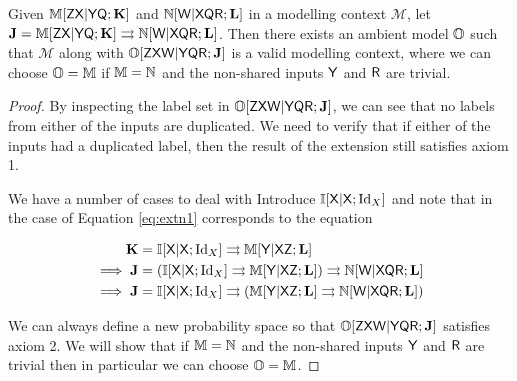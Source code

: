 \begin{theorem}
Given $\mathbb{M}[\mathsf{Z}\mathsf{X}|\mathsf{Y}\mathsf{Q};\mathbf{K}]$ and $\mathbb{N}[\mathsf{W}|\mathsf{X}\mathsf{Q}\mathsf{R};\mathbf{L}]$ in a modelling context $\mathscr{M}$, let $\mathbf{J}=\mathbb{M}[\mathsf{Z}\mathsf{X}|\mathsf{Y}\mathsf{Q};\mathbf{K}]\rightrightarrows \mathbb{N}[\mathsf{W}|\mathsf{X}\mathsf{Q}\mathsf{R};\mathbf{L}]$. Then there exists an ambient model $\mathbb{O}$ such that $\mathscr{M}$ along with $\mathbb{O}[\mathsf{Z}\mathsf{X}\mathsf{W}|\mathsf{Y}\mathsf{Q}\mathsf{R};\mathbf{J}]$ is a valid modelling context, where we can choose $\mathbb{O}=\mathbb{M}$ if $\mathbb{M}=\mathbb{N}$ and the non-shared inputs $\mathsf{Y}$ and $\mathsf{R}$ are trivial.
\end{theorem}

\begin{proof}
By inspecting the label set in $\mathbb{O}[\mathsf{Z}\mathsf{X}\mathsf{W}|\mathsf{Y}\mathsf{Q}\mathsf{R};\mathbf{J}]$, we can see that no labels from either of the inputs are duplicated. We need to verify that if either of the inputs had a duplicated label, then the result of the extension still satisfies axiom 1. 

We have a number of cases to deal with Introduce $\mathbb{I}[\mathsf{X}|\mathsf{X};\mathrm{Id}_X]$ and note that in the case of  Equation \ref{eq:extn1} corresponds to the equation

\begin{align}
	\mathbf{K} &= \mathbb{I}[\mathsf{X}|\mathsf{X};\mathrm{Id}_X]\rightrightarrows \mathbb{M}[\mathsf{Y}|\mathsf{XZ};\mathbf{L}]\\
	\implies \mathbf{J} &= (\mathbb{I}[\mathsf{X}|\mathsf{X};\mathrm{Id}_X]\rightrightarrows \mathbb{M}[\mathsf{Y}|\mathsf{XZ};\mathbf{L}])\rightrightarrows \mathbb{N}[\mathsf{W}|\mathsf{X}\mathsf{Q}\mathsf{R};\mathbf{L}]\\
	\implies \mathbf{J} &= \mathbb{I}[\mathsf{X}|\mathsf{X};\mathrm{Id}_X]\rightrightarrows(\mathbb{M}[\mathsf{Y}|\mathsf{XZ};\mathbf{L}]\rightrightarrows \mathbb{N}[\mathsf{W}|\mathsf{X}\mathsf{Q}\mathsf{R};\mathbf{L}])
\end{align}



We can always define a new probability space so that $\mathbb{O}[\mathsf{Z}\mathsf{X}\mathsf{W}|\mathsf{Y}\mathsf{Q}\mathsf{R};\mathbf{J}]$ satisfies axiom 2. We will show that if $\mathbb{M}=\mathbb{N}$ and the non-shared inputs $\mathsf{Y}$ and $\mathsf{R}$ are trivial then in particular we can choose $\mathbb{O}=\mathbb{M}$.
\end{proof}


